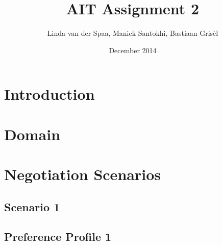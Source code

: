 \documentclass{article}
\title{AIT Assignment 2}
\author{Linda van der Spaa, Maniek Santokhi, Bastiaan Gris\`el}
\date{December 2014}
\begin{document}
\maketitle

\section{Introduction}

\section{Domain}

\section{Negotiation Scenarios}
\subsection{Scenario 1}
\subsection{Preference Profile 1}
\end{document}
